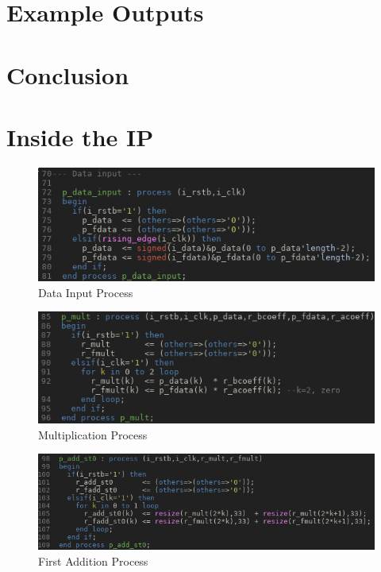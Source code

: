 \documentclass[12pt,a4paper,titlepage]{article}
\begin{document}
\section{Example Outputs}

\section{Conclusion}

\newpage

\appendix

\section{Inside the IP}
\begin{figure}[!htb]
  \centering
  \includegraphics[width=\textwidth]
                  {../presentation/data-input.png}
                  \caption{Data Input Process}
                  \label{fig:a0}
\end{figure}
\begin{figure}[!htb]
  \centering
  \includegraphics[width=\textwidth]
                  {../presentation/mult.png}
                  \caption{Multiplication Process}
                  \label{fig:a1}
\end{figure}
\begin{figure}[!htb]
  \centering
  \includegraphics[width=\textwidth]
                  {../presentation/add0.png}
                  \caption{First Addition Process}
                  \label{fig:a2}
\end{figure}
\end{document}
